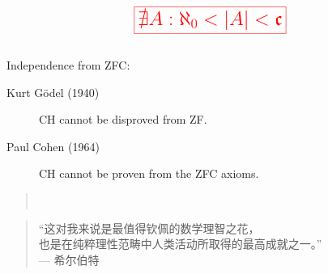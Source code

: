 
\begin{frame}{}
  \begin{center}
  \end{center}

  \[
    \red{\fbox{\text{\LARGE $\nexists A: \aleph_{0} < |A| < \mathfrak{c}$}}}
  \]
\end{frame}

\begin{frame}{}
  \begin{columns}
  \end{columns}

  \begin{center}
    {\leftpointright\; }
  \end{center}

  \pause
  Independence from ZFC: \\[1pt]
  \begin{description}
    \item[Kurt G\"odel (1940)] CH cannot be disproved from ZF.
    \item[Paul Cohen (1964)] CH cannot be proven from the ZFC axioms.
  \end{description}
\end{frame}

\begin{frame}{}

  \begin{quote}
    \begin{center}
       \\[8pt]

    \end{center}
  \end{quote}
\end{frame}

\begin{frame}{}
  \begin{quotation}
    ``这对我来说是最值得钦佩的数学理智之花，\\[6pt]
    也是在纯粹理性范畴中人类活动所取得的最高成就之一。''\\[5pt]
    \hfill --- 希尔伯特
  \end{quotation}

  \begin{columns}
  \end{columns}
\end{frame}
